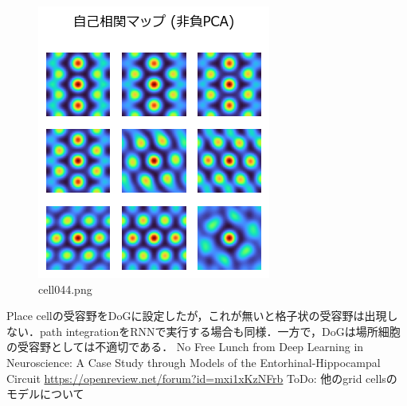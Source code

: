 \begin{figure}[ht]
	\centering
	\includegraphics[scale=0.8, max width=\linewidth]{./fig/local-learning-rule/pca-hebbian-learning/cell044.png}
	\caption{cell044.png}
	\label{cell044.png}
\end{figure}
Place cellの受容野をDoGに設定したが，これが無いと格子状の受容野は出現しない．path integrationをRNNで実行する場合も同様．一方で，DoGは場所細胞の受容野としては不適切である．
No Free Lunch from Deep Learning in Neuroscience: A Case Study through Models of the Entorhinal-Hippocampal Circuit 
\url{https://openreview.net/forum?id=mxi1xKzNFrb}
ToDo: 他のgrid cellsのモデルについて
